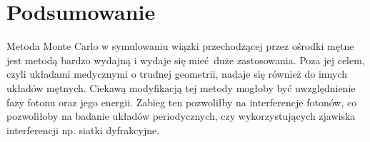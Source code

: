 \documentclass[a4paper, 12pt]{article}
\begin{document}
	\section*{Podsumowanie}
	
	Metoda Monte Carlo w symulowaniu wiązki przechodzącej przez ośrodki mętne jest metodą bardzo wydajną i wydaje się mieć duże zastosowania.
	Poza jej celem, czyli układami medycznymi o trudnej geometrii, nadaje się również do innych układów mętnych.
	Ciekawą modyfikacją tej metody mogłoby być uwzględnienie fazy fotonu oraz jego energii. 
	Zabieg ten pozwoliłby na interferencje fotonów, co pozwoliłoby na badanie układów periodycznych, czy wykorzystujących zjawiska interferencji np. siatki dyfrakcyjne.	
		
		
\end{document}
